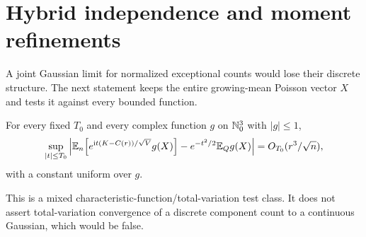 \section{Hybrid independence and moment refinements}\label{sfh:sec:hybrid}
A joint Gaussian limit for normalized exceptional counts would lose their discrete structure. The next statement keeps the entire growing-mean Poisson vector $X$ and tests it against every bounded function.

\begin{theorem}\label{sfh:thm:hybrid}
For every fixed $T_0$ and every complex function $g$ on $\mathbb N_0^3$ with $|g|\le1$,
\begin{align}\label{sfh:eq:hybrid}
 \sup_{|t|\le T_0}\left|
 \mathbb E_n\!\left[e^{\mathrm i t(K-C(r))/\sqrt V}g(X)\right]
      -e^{-t^2/2}\mathbb E_Qg(X)\right|
 =O_{T_0}(r^3/\sqrt n),
\end{align}
with a constant uniform over $g$.
\end{theorem}
This is a mixed characteristic-function/total-variation test class. It does not assert total-variation convergence of a discrete component count to a continuous Gaussian, which would be false.

